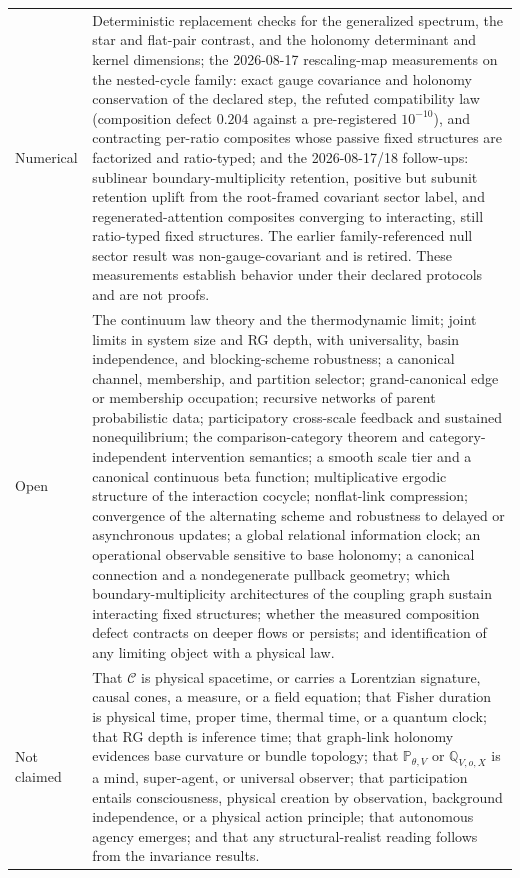 \documentclass[11pt,letterpaper]{article}
\begin{document}
{\begin{longtable}{>{\raggedright\arraybackslash}p{}>{\raggedright\arraybackslash}p{}}
\addlinespace
Numerical &
Deterministic replacement checks for the generalized spectrum, the star and flat-pair contrast, and the holonomy determinant and kernel dimensions; the 2026-08-17 rescaling-map measurements on the nested-cycle family: exact gauge covariance and holonomy conservation of the declared step, the refuted compatibility law (composition defect $0.204$ against a pre-registered $10^{-10}$), and contracting per-ratio composites whose passive fixed structures are factorized and ratio-typed; and the 2026-08-17/18 follow-ups: sublinear boundary-multiplicity retention, positive but subunit retention uplift from the root-framed covariant sector label, and regenerated-attention composites converging to interacting, still ratio-typed fixed structures. The earlier family-referenced null sector result was non-gauge-covariant and is retired. These measurements establish behavior under their declared protocols and are not proofs. \\
\addlinespace
Open &
The continuum law theory and the thermodynamic limit; joint limits in system size and RG depth, with universality, basin independence, and blocking-scheme robustness; a canonical channel, membership, and partition selector; grand-canonical edge or membership occupation; recursive networks of parent probabilistic data; participatory cross-scale feedback and sustained nonequilibrium; the comparison-category theorem and category-independent intervention semantics; a smooth scale tier and a canonical continuous beta function; multiplicative ergodic structure of the interaction cocycle; nonflat-link compression; convergence of the alternating scheme and robustness to delayed or asynchronous updates; a global relational information clock; an operational observable sensitive to base holonomy; a canonical connection and a nondegenerate pullback geometry; which boundary-multiplicity architectures of the coupling graph sustain interacting fixed structures; whether the measured composition defect contracts on deeper flows or persists; and identification of any limiting object with a physical law. \\
\addlinespace
Not claimed &
That \(\mathcal C\) is physical spacetime, or carries a Lorentzian signature, causal cones, a measure, or a field equation; that Fisher duration is physical time, proper time, thermal time, or a quantum clock; that RG depth is inference time; that graph-link holonomy evidences base curvature or bundle topology; that \(\mathbb P_{\theta,V}\) or \(\mathbb Q_{V,o,X}\) is a mind, super-agent, or universal observer; that participation entails consciousness, physical creation by observation, background independence, or a physical action principle; that autonomous agency emerges; and that any structural-realist reading follows from the invariance results. \\
\end{longtable}
}
\end{document}
